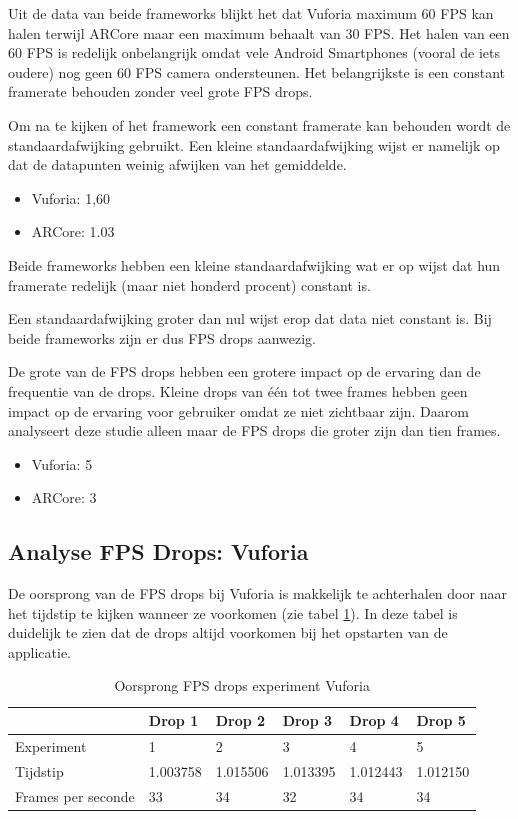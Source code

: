 Uit de data van beide frameworks blijkt het dat Vuforia maximum 60 FPS kan halen terwijl ARCore maar een maximum behaalt van 30 FPS. Het halen van een 60 FPS is redelijk onbelangrijk omdat vele Android Smartphones (vooral de iets oudere) nog geen 60 FPS camera ondersteunen. Het belangrijkste is een constant framerate behouden zonder veel grote FPS drops.

Om na te kijken of het framework een constant framerate kan behouden wordt de standaardafwijking gebruikt. Een kleine standaardafwijking wijst er namelijk op dat de datapunten weinig afwijken van het gemiddelde.

\begin{itemize}
    \item Vuforia: 1,60
    \item ARCore: 1.03
\end{itemize}

Beide frameworks hebben een kleine standaardafwijking wat er op wijst dat hun framerate redelijk (maar niet honderd procent) constant is. 

Een standaardafwijking groter dan nul wijst erop dat data niet constant is. Bij beide frameworks zijn er dus FPS drops aanwezig.

De grote van de FPS drops hebben een grotere impact op de ervaring dan de frequentie van de drops. Kleine drops van één tot twee frames hebben geen impact op de ervaring voor gebruiker omdat ze niet zichtbaar zijn. Daarom analyseert deze studie alleen maar de FPS drops die groter zijn dan tien frames.

\begin{itemize}
    \item Vuforia: 5
    \item ARCore: 3
\end{itemize}

\subsection{Analyse FPS Drops: Vuforia}

De oorsprong van de FPS drops bij Vuforia is makkelijk te achterhalen door naar het tijdstip te kijken wanneer ze voorkomen (zie tabel \ref{tbl:vuforiadrop}). In deze tabel is duidelijk te zien dat de drops altijd voorkomen bij het opstarten van de applicatie.

\begin{table}[]
    \begin{tabular}{@{}l|l|l|l|l|l@{}}
        & Drop 1   & Drop 2   & Drop 3   & Drop 4   & Drop 5   \\ \midrule
        Experiment         & 1        & 2        & 3        & 4        & 5        \\
        Tijdstip           & 1.003758 & 1.015506 & 1.013395 & 1.012443 & 1.012150 \\
        Frames per seconde & 33       & 34       & 32       & 34       & 34      
    \end{tabular}
    \caption{Oorsprong FPS drops experiment Vuforia}\label{tbl:vuforiadrop}
\end{table}

